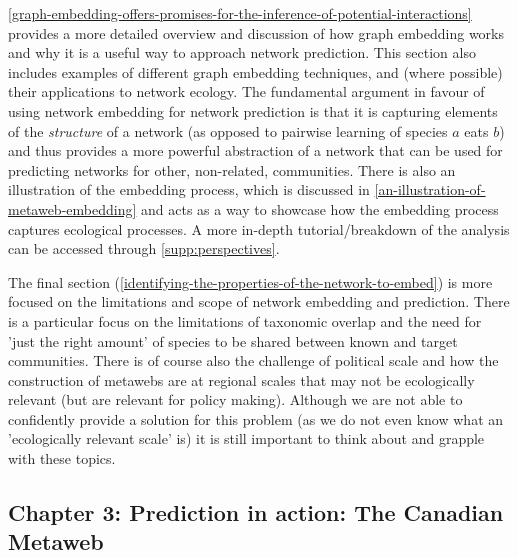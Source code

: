 \autoref{graph-embedding-offers-promises-for-the-inference-of-potential-interactions} provides a more detailed overview and discussion of how graph embedding works and why it is a useful way to approach network prediction. This section also includes examples of different graph embedding techniques, and (where possible) their applications to network ecology. The fundamental argument in favour of using network embedding for network prediction is that it is capturing elements of the \emph{structure} of a network (as opposed to pairwise learning of species $a$ eats $b$) and thus provides a more powerful abstraction of a network that can be used for predicting networks for other, non-related, communities. There is also an illustration of the embedding process, which is discussed in \autoref{an-illustration-of-metaweb-embedding} and acts as a way to showcase how the embedding process captures ecological processes. A more in-depth tutorial/breakdown of the analysis can be accessed through \autoref{supp:perspectives}.

The final section (\autoref{identifying-the-properties-of-the-network-to-embed}) is more focused on the limitations and scope of network embedding and prediction. There is a particular focus on the limitations of taxonomic overlap and the need for 'just the right amount' of species to be shared between known and target communities. There is of course also the challenge of political scale and how the construction of metawebs are at regional scales that may not be ecologically relevant (but are relevant for policy making). Although we are not able to confidently provide a solution for this problem (as we do not even know what an 'ecologically relevant scale' is) it is still important to think about and grapple with these topics.

\subsection{Chapter 3: Prediction in action: The Canadian Metaweb}

